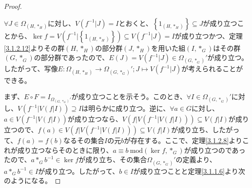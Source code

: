 \documentclass[dvipdfmx]{jsarticle}
\begin{document}
\begin{proof}
\begin{center}
\end{center}
$\forall J \in \varOmega_{\left( H,*_{H} \right)}$に対し、$V\left( f^{- 1}|J \right) = I$とおくと、$\left\{ 1_{\left( H,*_{H} \right)} \right\} \subseteq J$が成り立つことから、$\ker f = V\left( f^{- 1}|\left\{ 1_{\left( H,*_{H} \right)} \right\} \right) \subseteq V\left( f^{- 1}|J \right) = I$が成り立つかつ、定理\ref{3.1.2.12}よりその群$\left( H,*_{H} \right)$の部分群$\left( J,*_{H} \right)$を用いた組$\left( I,*_{G} \right)$はその群$\left( G,*_{G} \right)$の部分群であったので、$E(J) = V\left( f^{- 1}|J \right) \in \varOmega_{\left( G,*_{G} \right)}'$が成り立つ。したがって、写像$E:\varOmega_{\left( H,*_{H} \right)} \rightarrow \varOmega_{\left( G,*_{G} \right)}';J \mapsto V\left( f^{- 1}|J \right)$が考えられることができる。\par
まず、$E \circ F = I_{\varOmega_{\left( G,*_{G} \right)}'}$が成り立つことを示そう。このとき、$\forall I \in \varOmega_{\left( G,*_{G} \right)}'$に対し、$V\left( f^{- 1}|V\left( f|I \right) \right) \supseteq I$は明らかに成り立つ。逆に、$\forall a \in G$に対し、$a \in V\left( f^{- 1}|V\left( f|I \right) \right)$が成り立つなら、$V\left( f|V\left( f^{- 1}|V\left( f|I \right) \right) \right) \subseteq V\left( f|I \right)$が成り立つので、$f(a) \in V\left( f|V\left( f^{- 1}|V\left( f|I \right) \right) \right) \subseteq V\left( f|I \right)$が成り立ち、したがって、$f(a) = f(b)$なるその集合$I$の元$b$が存在する。ここで、定理\ref{3.1.2.8}よりこれが成り立つならそのときに限り、$a \equiv b\ \mathrm{mod}\left( \ker f,*_{G} \right)$が成り立つのであったので、$a*_{G}b^{- 1} \in \ker f$が成り立ち、その集合$\varOmega_{\left( G,*_{G} \right)}'$の定義より、$a*_{G}b^{- 1} \in I$が成り立つ。したがって、$b \in I$が成り立つことと定理\ref{3.1.1.6}より次のようになる。

\end{proof}
\end{document}
